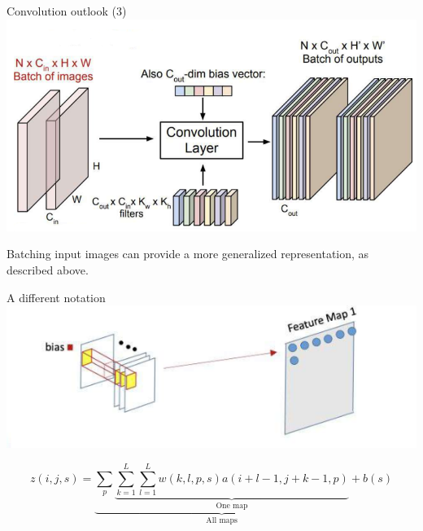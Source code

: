 \documentclass[default, aspectratio=169]{beamer}
\begin{document}
	\begin{frame}{Convolution outlook (3)}
		\centering
		\includegraphics[keepaspectratio, scale=0.7]{pic/img7.png}
		\smallskip
		\begin{flushleft}
			\small Batching input images can provide a more generalized representation, as described above.
		\end{flushleft}		
	\end{frame}
	\begin{frame}{A different notation}
		\centering
		\includegraphics[keepaspectratio, scale=0.9]{pic/diff_view.png}
		
		
		\[ z(i,j,s) = \underbrace{\sum_p \underbrace{\sum_{k=1}^{L} \sum_{l=1}^{L} w(k,l,p,s) a(i+l-1, j+k-1, p)}_{\text{One map}}}_{\text{All maps}} + b(s) \]
		
	\end{frame}
\end{document}
